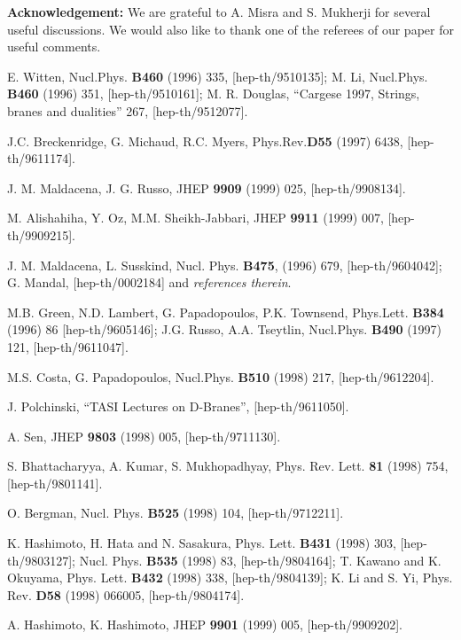 \documentclass[a4paper,12pt]{article}
\begin{document}
{\bf Acknowledgement: } We are grateful to  A. Misra and S. Mukherji 
for several useful discussions. We would also like to thank one 
of the referees of our paper for useful comments. 

\begin{thebibliography}{99}

 E. Witten,  Nucl.Phys. {\bf B460} (1996) 335,   
 [hep-th/9510135];
M. Li, Nucl.Phys. {\bf B460} (1996) 351, [hep-th/9510161]; 
M. R. Douglas, ``Cargese 1997, Strings, 
branes and dualities'' 267, [hep-th/9512077].

 J.C. Breckenridge, G. Michaud, R.C. Myers,
 Phys.Rev.{\bf D55} (1997) 6438, [hep-th/9611174].

 J. M. Maldacena, J. G. Russo, JHEP {\bf 9909} (1999)
  025, [hep-th/9908134].

 M. Alishahiha, Y. Oz, M.M. Sheikh-Jabbari, JHEP {\bf
    9911} (1999) 007, [hep-th/9909215].
 
 J. M. Maldacena, L. Susskind, Nucl. Phys. {\bf
 B475}, (1996) 679, [hep-th/9604042];
G. Mandal, [hep-th/0002184] and {\it references therein}.

 M.B. Green, N.D. Lambert, G. Papadopoulos,
P.K. Townsend, Phys.Lett. {\bf B384} (1996) 86 [hep-th/9605146]; 
J.G. Russo, A.A. Tseytlin, 
Nucl.Phys. {\bf B490} (1997) 121, [hep-th/9611047].

 M.S. Costa, G. Papadopoulos, Nucl.Phys. {\bf B510}
(1998) 217, [hep-th/9612204]. 


 J. Polchinski, ``TASI Lectures on D-Branes'',
 [hep-th/9611050].

 A. Sen, JHEP {\bf 9803} (1998) 005, [hep-th/9711130].

 S. Bhattacharyya, A. Kumar, S. Mukhopadhyay, 
Phys. Rev. Lett. {\bf 81} (1998) 754, [hep-th/9801141].

 O. Bergman, Nucl. Phys. {\bf B525} (1998) 104, 
[hep-th/9712211]. 

 K. Hashimoto, H. Hata and N. Sasakura, Phys. Lett. 
{\bf B431} (1998) 303, [hep-th/9803127]; Nucl. Phys. {\bf B535} (1998) 83,
[hep-th/9804164]; T. Kawano and K. Okuyama, Phys. Lett. {\bf B432} (1998) 338,
[hep-th/9804139]; K. Li and S. Yi, Phys. Rev. {\bf D58} (1998) 066005, 
[hep-th/9804174].

 A. Hashimoto, K. Hashimoto, JHEP {\bf 9901} (1999)
  005, [hep-th/9909202].


\end{thebibliography}
\end{document}
